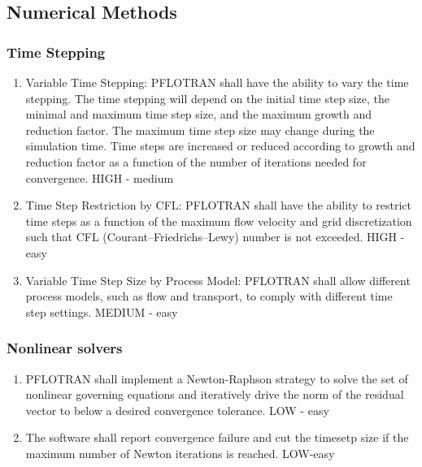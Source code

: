 \subsection{Numerical Methods}

\subsubsection{Time Stepping}
\begin{enumerate}[label=NM \arabic*.,ref=NM \arabic*,nosep]
	\item Variable Time Stepping: \label{NMvarTS} PFLOTRAN shall have the ability to vary the time stepping. The time stepping will depend on the initial time step size, the minimal and maximum time step size, and the maximum growth and reduction factor. The maximum time step size may change during the simulation time. Time steps are increased or reduced according to growth and reduction factor as a function of the number of iterations needed for convergence. HIGH - medium
	\item Time Step Restriction by CFL: \label{TSbyCFL} PFLOTRAN shall have the ability to restrict time steps as a function of the maximum flow velocity and grid discretization such that CFL (Courant–Friedrichs–Lewy) number is not exceeded. HIGH - easy
	\item Variable Time Step Size by Process Model: \label{TSbyModel} PFLOTRAN shall allow different process models, such as flow and transport, to comply with different time step settings. MEDIUM - easy
\end{enumerate}

\subsubsection{Nonlinear solvers}
\begin{enumerate}[label=NM \arabic*.,ref=NM \arabic*,nosep, resume]
	\item PFLOTRAN shall implement a Newton-Raphson strategy to solve the set of nonlinear governing equations and iteratively drive the norm of the residual vector to below a desired convergence tolerance. \label{nonlinearSolver} LOW - easy
	\item The software shall report convergence failure and cut the timesetp size if the maximum number of Newton iterations is reached. \label{nonlinearReport} LOW-easy
\end{enumerate}

